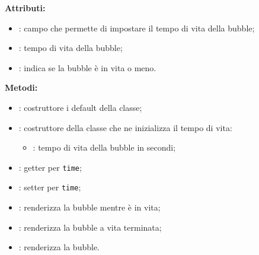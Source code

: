 \textbf{Attributi:}
\begin{itemize}
	\item {}: campo che permette di impostare il tempo di vita della bubble;
	\item {}: tempo di vita della bubble;
	\item {}: indica se la bubble è in vita o meno.
\end{itemize}

\textbf{Metodi:}
\begin{itemize}
	\item {}: costruttore i default della classe;
	\item {}: costruttore della classe che ne inizializza il tempo di vita:
	\begin{itemize}
		\item {}: tempo di vita della bubble in secondi;
	\end{itemize}
	\item {}: getter per \texttt{time};
	\item {}: setter per \texttt{time};
	\item {}: renderizza la bubble mentre è in vita;
	\item {}: renderizza la bubble a vita terminata;
	\item {}: renderizza la bubble.
\end{itemize}

